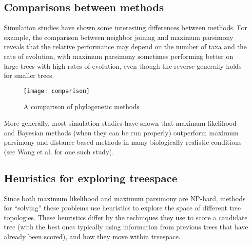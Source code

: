 \subsection{Comparisons between methods} \cite{hall}
Simulation studies have shown some interesting 
differences between methods. For example, the 
comparison between neighbor joining and maximum 
parsimony reveals that the relative performance may 
depend on the number of taxa and the rate of evolution, 
with maximum parsimony sometimes performing better 
on large trees with high rates of evolution, even 
though the reverse generally holds for smaller trees.  

\begin{figure}[t] 
  \center
  \texttt{[image: comparison]}
  \caption[w]{A comparison of phylogenetic methods \cite{comparison}} 
  \label{img:comparison}  
\end{figure}

More generally, most simulation studies have shown 
that maximum likelihood and Bayesian methods 
(when they can be run properly) outperform maximum 
parsimony and distance-based methods in many 
biologically realistic conditions 
(see Wang et al. for one such study). \cite{simmons}

\subsection{Heuristics for exploring treespace}
Since both maximum likelihood and maximum parsimony 
are NP-hard, methods for ``solving'' these problems 
use heuristics to explore the space of different tree 
topologies. These heuristics differ by the techniques 
they use to score a candidate tree (with the best 
ones typically using information from previous 
trees that have already been scored), and how 
they move within treespace. 
 

\newpage